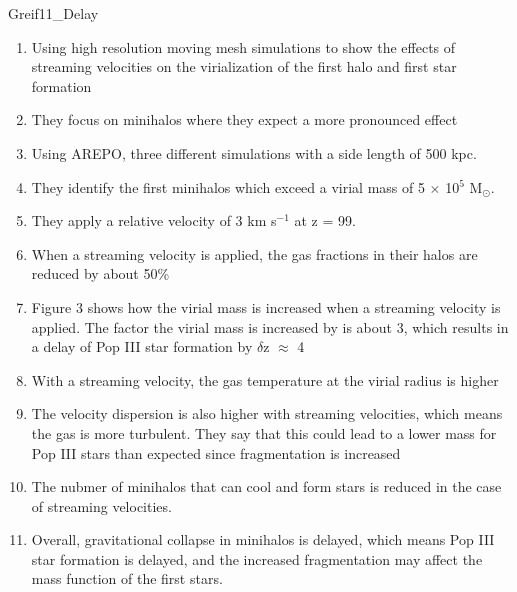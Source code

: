 \documentclass[a4paper,fleqn,usenatbib]{mnras}
\begin{document}
\li Greif11\_Delay
\begin{enumerate}
	\item Using high resolution moving mesh simulations to show the effects of streaming velocities on the virialization of the first halo and first star formation
	\item They focus on minihalos where they expect a more pronounced effect
	\item Using AREPO, three different simulations with a side length of 500 kpc.
	\item They identify the first minihalos which exceed a virial mass of 5 $\times$ 10$^{5}$ M$_{\odot}$.
	\item They apply a relative velocity of 3 km s$^{-1}$ at z = 99.
	\item When a streaming velocity is applied, the gas fractions in their halos are reduced by about 50\%
	\item Figure 3 shows how the virial mass is increased when a streaming velocity is applied. The factor the virial mass is increased by is about 3, which results in a delay of Pop III star formation by $\delta$z $\approx$ 4
	\item With a streaming velocity, the gas temperature at the virial radius is higher
	\item The velocity dispersion is also higher with streaming velocities, which means the gas is more turbulent. They say that this could lead to a lower mass for Pop III stars than expected since fragmentation is increased
	\item The nubmer of minihalos that can cool and form stars is reduced in the case of streaming velocities. 
	\item Overall, gravitational collapse in minihalos is delayed, which means Pop III star formation is delayed, and the increased fragmentation may affect the mass function of the first stars. 
\end{enumerate}
\end{document}
